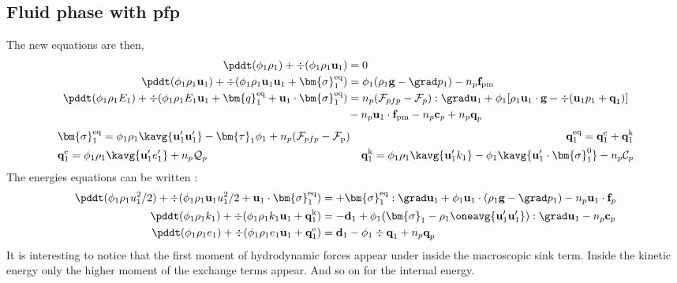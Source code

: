 \subsection*{Fluid phase with pfp}
The new equations are then, 
\begin{align}
    \pddt (\phi_1 \rho_1)  
    + \div (
        \phi_1 \rho_1\textbf{u}_1
    )
    &= 
    0\\
    \pddt (\phi_1 \rho_1\textbf{u}_1)  
    + \div (
        \phi_1 \rho_1\textbf{u}_1\textbf{u}_1
        + \bm{\sigma}_1^\text{eq}
    )
    &= 
    \phi_1 (\rho_1 \textbf{g} 
    - \grad p_1 ) 
    -  n_p \textbf{f}_\text{pm}\\
    \pddt (\phi_1\rho_1E_1)  
    + \div (
        \phi_1\rho_1E_1\textbf{u}_1
        + \bm{q}_1^\text{eq}
        + \textbf{u}_1 \cdot \bm{\sigma}_1^\text{eq}
        )
    &= 
    n_p (\mathcal{F}_{pfp}- \mathcal{F}_p) :\grad \textbf{u}_1
    +\phi_1 [\rho_1\textbf{u}_1 \cdot \textbf{g} 
    - \div(\textbf{u}_1p_1 + \textbf{q}_1)]\nonumber\\
    &- n_p \textbf{u}_1 \cdot \textbf{f}_\text{pm}
    - n_p \textbf{c}_p
    + n_p \textbf{q}_p
\end{align} 
\begin{align*}
    &\bm{\sigma}_1^\text{eq}
    = \phi_1\rho_1\kavg{\textbf{u}_1'\textbf{u}_1'}
    - \bm{\tau}_1 \phi_1
    + n_p (\mathcal{F}_{pfp} - \mathcal{F}_\text{p})
    &\textbf{q}_1^\text{eq}
    =\textbf{q}_1^\text{e} +\textbf{q}_1^\text{k} \\
    &\textbf{q}_1^\text{e}
    = \phi_1\rho_1 \kavg{\textbf{u}_1' e_1'} + n_p \mathcal{Q}_p
    &\textbf{q}_1^\text{k}
    = \phi_1\rho_1 \kavg{\textbf{u}_1' k_1} 
    - \phi_1\kavg{\textbf{u}_1' \cdot \bm{\sigma}_1^0}
    - n_p \mathcal{C}_p 
\end{align*}
The energies equations can be written : 
\begin{align}
    \pddt (\phi_1 \rho_1u_1^2/2)  
    + \div (
        \phi_1 \rho_1\textbf{u}_1u_1^2/2
        + \textbf{u}_1 \cdot \bm{\sigma}_1^\text{eq}
    )
    &= 
    + \bm{\sigma}_1^\text{eq} : \grad \textbf{u}_1
    + \phi_1  \textbf{u}_1\cdot(\rho_1 \textbf{g} - \grad p_1) 
    - n_p \textbf{u}_1\cdot \textbf{f}_p\\
    \pddt (\phi_1\rho_1k_1)  
    + \div (
        \phi_1\rho_1k_1\textbf{u}_1
        + \textbf{q}_1^\text{k} 
        )
    &= 
    - \textbf{d}_1
    + \phi_1(\bm{\sigma}_1 - \rho_1 \oneavg{\textbf{u}_1'\textbf{u}_1'} ): \grad \textbf{u}_1
    - n_p \textbf{c}_p\\
    \pddt (\phi_1\rho_1e_1)  
    + \div (
        \phi_1 \rho_1e_1\textbf{u}_1
        +
        \textbf{q}_1^\text{e} 
        )
    &= 
    \textbf{d}_1
    - \phi_1 \div \textbf{q}_1
    + n_p \textbf{q}_p
\end{align}
It is interesting to notice that the first moment of hydrodynamic forces appear under inside the macroscopic sink term. 
Inside the kinetic energy only the higher moment of the exchange terms appear. 
And so on for the internal energy. 

